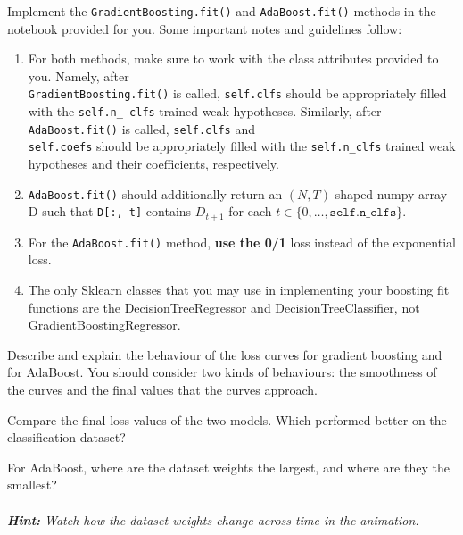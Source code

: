 \problem[14] Implement the \texttt{GradientBoosting.fit()} and \texttt{AdaBoost.fit()} methods in
the notebook provided for you. Some important notes and guidelines follow:
\begin{enumerate}[$\bullet$]
\item For both methods, make sure to work with the class attributes provided to you. Namely, after\\
\texttt{GradientBoosting.fit()} is called, \texttt{self.clfs} should be appropriately filled with the \texttt{self.n_-clfs} trained weak hypotheses. Similarly, after \texttt{AdaBoost.fit()} is called, \texttt{self.clfs} and\\
\texttt{self.coefs}
should be appropriately filled with the \texttt{self.n_clfs} trained weak hypotheses and their coefficients, respectively.
\item \texttt{AdaBoost.fit()} should additionally return an $(N, T)$ shaped numpy array D such that \texttt{D[:, t]} contains $D_{t+1}$ for each $t \in \{0, \dots, \texttt{self.n_clfs}\}$.
\item For the \texttt{AdaBoost.fit()} method, \textbf{use the 0/1} loss instead of the exponential loss.
\item The only Sklearn classes that you may use in implementing your boosting fit functions are the DecisionTreeRegressor and DecisionTreeClassifier, not GradientBoostingRegressor.
\end{enumerate}
\begin{solution}\normalfont{
}\end{solution}
\newpage


\problem[2] Describe and explain the behaviour of the loss curves for gradient boosting and for
AdaBoost. You should consider two kinds of behaviours: the smoothness of the curves and the final values that the curves approach.
\begin{solution}\end{solution}
\newpage


\problem[2] Compare the final loss values of the two models. Which performed better on the
classification dataset?
\begin{solution}\end{solution}
\newpage


\problem[2] For AdaBoost, where are the dataset weights the largest, and where are they the
smallest?\\
\\
\textit{\textbf{Hint:} Watch how the dataset weights change across time in the animation.}
\begin{solution}\normalfont{
}\end{solution}
\newpage





